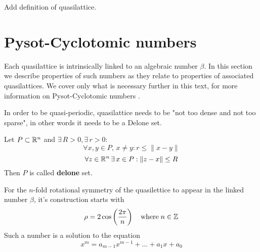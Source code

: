 \documentclass[text.tex]{subfiles}
\begin{document}
Add definition of quasilattice. 

\section{Pysot-Cyclotomic numbers}
Each quasilattice is intrinsically linked to an algebraic number $\beta$. In this section we describe properties of such numbers as they relate to properties of associated quasilattices. We cover only what is necessary further in this text,  for more information on Pysot-Cyclotomic numbers \cite{}. 

In order to be quasi-periodic, quasilattice needs to be "not too dense and not too sparse", in other words it needs to be a Delone set. 

\begin{definition} 
Let $P\subset \mathbb{R}^n$ and $\exists\, R>0, \exists\, r>0$:
$$\forall x,y\in P,\, x\neq y: r\leq \|x-y\|$$
$$\forall z\in\mathbb{R}^n\, \exists\, x\in P: \|z-x\|\leq R$$
Then $P$ is called \textbf{delone} set.\\
\end{definition}

For the $n$-fold rotational symmetry of the quasilettice to appear in the linked number $\beta$, it's construction starts with 
$$\rho = 2\cos\left(\frac{2\pi}{n}\right) \quad \text{where} \; n\in\mathbb{Z}$$
Such a number is a solution to the equation 
$$x^m = a_{m-1}x^{m-1}+\dots+a_1x+a_0$$
\end{document}

